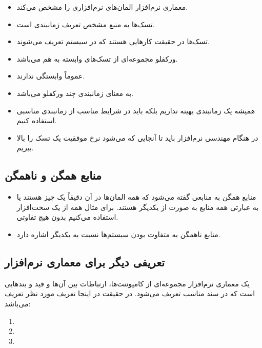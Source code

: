 \documentclass[a4paper]{article}
\begin{document}
\begin{itemize}
    \item معماری نرم‌افزار المان‌های نرم‌افزاری را مشخص می‌کند.
    \item {} تسک‌ها به منبع مشخص تعریف زمانبندی است.
    \item تسک‌ها در حقیقت کار‌هایی هستند که در سیستم تعریف می‌شوند.
    \item ورکفلو مجموعه‌ای از تسک‌های وابسته به هم می‌باشد.
    \item {} عموماً وابستگی ندارند.
    \item {} به معنای زمانبندی چند ورکفلو
    می‌باشد.
    \item همیشه یک زمانبندی بهینه نداریم بلکه باید در شرایط مناسب از زمانبندی
    مناسبی استفاده کنیم.
    \item در هنگام مهندسی نرم‌افزار باید تا آنجایی که می‌شود نرخ موفقیت یک تسک
    را بالا ببریم.
\end{itemize}

\subsection{منابع همگن و ناهمگن}

\begin{itemize}
    \item منابع همگن به منابعی گفته می‌شود که همه المان‌ها در آن دقیقاً یک چیز
    هستند یا به عبارتی همه منابع به صورت  از یکدیگر هستند. برای مثال
    همه از یک سخت‌افزار استفاده می‌کنیم بدون هیچ تفاوتی.
    \item منابع ناهمگن به متفاوت بودن سیستم‌ها نسبت به یکدیگر اشاره دارد.
\end{itemize}

\subsection{تعریفی دیگر برای معماری نرم‌افزار}

یک معماری نرم‌افزار مجموعه‌ای از کامپوننت‌ها، ارتباطات بین آن‌ها و قید و
بند‌هایی است که در سند مناسب تعریف می‌شود. در حقیقت در اینجا تعریف مورد نظر
تعریف  می‌باشد:

\begin{enumerate}
    \item {}
    \item {}
    \item {}
\end{enumerate}
\end{document}
